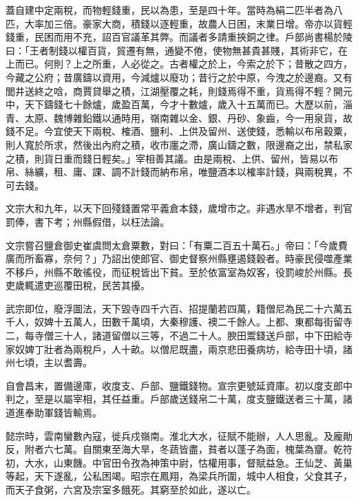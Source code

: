 \begin{pinyinscope}
 蓋自建中定兩稅，而物輕錢重，民以為患，至是四十年。當時為絹二匹半者為八匹，大率加三倍。豪家大商，積錢以逐輕重，故農人日困，末業日增。帝亦以貨輕錢重，民困而用不充，詔百官議革其弊。而議者多請重挾銅之律。戶部尚書楊於陵曰：「王者制錢以權百貨，貿遷有無，通變不倦，使物無甚貴甚賤，其術非它，在上而已。何則？上之所重，人必從之。古者權之於上，今索之於下；昔散之四方，今藏之公府；昔廣鑄以資用，今減爐以廢功；昔行之於中原，今洩之於邊裔。又有閭井送終之唅，商賈貸舉之積，江湖壓覆之耗，則錢焉得不重，貨焉得不輕？開元中，天下鑄錢七十餘爐，歲盈百萬，今才十數爐，歲入十五萬而已。大歷以前，淄青、太原、魏博雜鉛鐵以通時用，嶺南雜以金、銀、丹砂、象齒，今一用泉貨，故錢不足。今宜使天下兩稅、榷酒、鹽利、上供及留州、送使錢，悉輸以布帛穀粟，則人寬於所求，然後出內府之積，收市廛之滯，廣山鑄之數，限邊裔之出，禁私家之積，則貨日重而錢日輕矣。」宰相善其議。由是兩稅、上供、留州，皆易以布帛、絲纊，租、庸、課、調不計錢而納布帛，唯鹽酒本以榷率計錢，與兩稅異，不可去錢。



 文宗大和九年，以天下回殘錢置常平義倉本錢，歲增市之。非遇水旱不增者，判官罰俸，書下考；州縣假借，以枉法論。



 文宗嘗召鹽倉御史崔虞問太倉粟數，對曰：「有粟二百五十萬石。」帝曰：「今歲費廣而所畜寡，奈何？」乃詔出使郎官、御史督察州縣壅遏錢穀者。時豪民侵噬產業不移戶，州縣不敢徭役，而征稅皆出下貧。至於依富室為奴客，役罰峻於州縣。長吏歲輒遣吏巡覆田稅，民苦其擾。



 武宗即位，廢浮圖法，天下毀寺四千六百、招提蘭若四萬，籍僧尼為民二十六萬五千人，奴婢十五萬人，田數千萬頃，大秦穆護、襖二千餘人。上都、東都每街留寺二，每寺僧三十人，諸道留僧以三等，不過二十人。腴田鬻錢送戶部，中下田給寺家奴婢丁壯者為兩稅戶，人十畝。以僧尼既盡，兩京悲田養病坊，給寺田十頃，諸州七頃，主以耆壽。



 自會昌末，置備邊庫，收度支、戶部、鹽鐵錢物。宣宗更號延資庫。初以度支郎中判之，至是以屬宰相，其任益重。戶部歲送錢帛二十萬，度支鹽鐵送者三十萬，諸道進奉助軍錢皆輸焉。



 懿宗時，雲南蠻數內寇，徙兵戍嶺南。淮北大水，征賦不能辦，人人思亂。及龐勛反，附者六七萬。自關東至海大旱，冬蔬皆盡，貧者以蓬子為面，槐葉為齏。乾符初，大水，山東饑。中官田令孜為神策中尉，怙權用事，督賦益急。王仙芝、黃巢等起，天下遂亂，公私困竭。昭宗在鳳翔，為梁兵所圍，城中人相食，父食其子，而天子食粥，六宮及宗室多餓死。其窮至於如此，遂以亡。




\end{pinyinscope}
